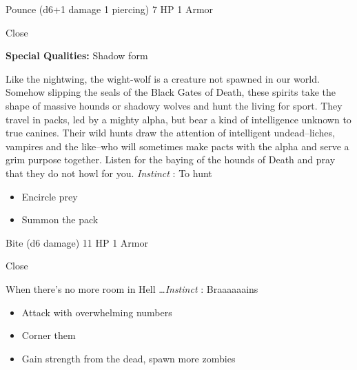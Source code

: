 

 Pounce (d6+1 damage 1 piercing) 7 HP 1 Armor


 Close


 \textbf{Special Qualities:}
 Shadow form


 Like the nightwing, the wight-wolf is a creature not spawned in our world. Somehow slipping the seals of the Black Gates of Death, these spirits take the shape of massive hounds or shadowy wolves and hunt the living for sport. They travel in packs, led by a mighty alpha, but bear a kind of intelligence unknown to true canines. Their wild hunts draw the attention of intelligent undead--liches, vampires and the like--who will sometimes make pacts with the alpha and serve a grim purpose together. Listen for the baying of the hounds of Death and pray that they do not howl for you. \emph{Instinct}
: To hunt
\begin{itemize}
\item Encircle prey
\item Summon the pack

\end{itemize}




 Bite (d6 damage) 11 HP 1 Armor


 Close


 When there's no more room in Hell \ldots  \emph{Instinct}
: Braaaaaains
\begin{itemize}
\item Attack with overwhelming numbers
\item Corner them
\item Gain strength from the dead, spawn more zombies

\end{itemize}


